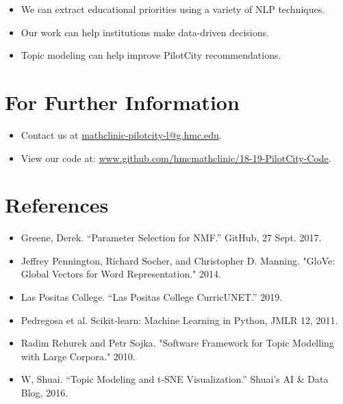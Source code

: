 \documentclass[clinic]{hmcposter}
\begin{document}
\begin{poster}
\begin{itemize}
    \item We can extract educational priorities using a variety of NLP techniques.
    \item Our work can help institutions make data-driven decisions.
    \item Topic modeling can help improve PilotCity recommendations.
\end{itemize}

\section{For Further Information}

\begin{itemize}
\item Contact us at \url{mathclinic-pilotcity-l@g.hmc.edu}.
\item View our code at:  \url{www.github.com/hmcmathclinic/18-19-PilotCity-Code}.
\end{itemize}

\section{References}
{\small 
\begin{itemize}
    \item Greene, Derek. “Parameter Selection for NMF.” GitHub, 27 Sept. 2017.
    \item Jeffrey Pennington, Richard Socher, and Christopher D. Manning. "GloVe: Global Vectors for Word Representation." 2014. 
    \item Las Positas College. “Las Positas College CurricUNET.” 2019.
    \item Pedregosa et al. Scikit-learn: Machine Learning in Python, JMLR 12, 2011.
    \item Radim Rehurek and Petr Sojka. "Software Framework for Topic Modelling with Large Corpora." 2010.
    \item W, Shuai. “Topic Modeling and t-SNE Visualization.” Shuai's AI & Data Blog, 2016.
\end{itemize}
}



\end{poster}
\end{document}
